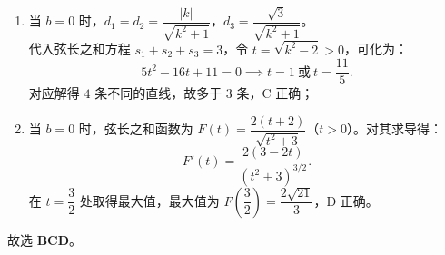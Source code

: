 {\begin{enumerate}[leftmargin=2em, label=\textbf{\Alph*.}, itemsep=0.4em, topsep=0.3em]
    \item 当 \(b = 0\) 时，\(d_1 = d_2 = \dfrac{|k|}{\sqrt{k^2+1}}\)，\(d_3 = \dfrac{\sqrt{3}}{\sqrt{k^2+1}}\)。\\
      代入弦长之和方程 \(s_1 + s_2 + s_3 = 3\)，令 \(t = \sqrt{k^2-2} > 0\)，可化为：
      \[
        5t^2 - 16t + 11 = 0 \implies t = 1 \ \text{或} \ t = \frac{11}{5}.
      \]
      对应解得 \(4\) 条不同的直线，故多于 3 条，C 正确；

    \item 当 \(b = 0\) 时，弦长之和函数为 \(F(t) = \dfrac{2(t+2)}{\sqrt{t^2+3}}\)（\(t > 0\)）。对其求导得：
      \[
        F'(t) = \frac{2(3-2t)}{(t^2+3)^{3/2}}.
      \]
      在 \(t = \dfrac{3}{2}\) 处取得最大值，最大值为 \(F\left(\dfrac{3}{2}\right) = \dfrac{2\sqrt{21}}{3}\)，D 正确。
  \end{enumerate}

  故选 \textbf{BCD}。%
}

\newcommand{\qConicCircleChordsDiagnosis}{%
  本题为解析几何难题。A 选项极易在考场上凭直观感觉误判为正确，必须通过代数不等式区间交集为虚来推翻。C、D 选项将复杂的几何条件降维至 \(b=0\)，并通过换元法将无理方程化为一元二次方程和一元函数求导最值问题，体现了高超的代数化简功底。%
}

\newcommand{\qConicCircleChordsTeachingNotes}{%
  授课时可重点分析该题的思维突破点：对于具有对称性质的多选题，当选项中包含特殊假设（如“当 \(b=0\) 时”）时，应顺水推舟，将一般性问题退化为特殊情况进行代数代换，利用“换元法”和“导数求最值”来迅速攻克复杂的无理函数最大值问题。%
}
